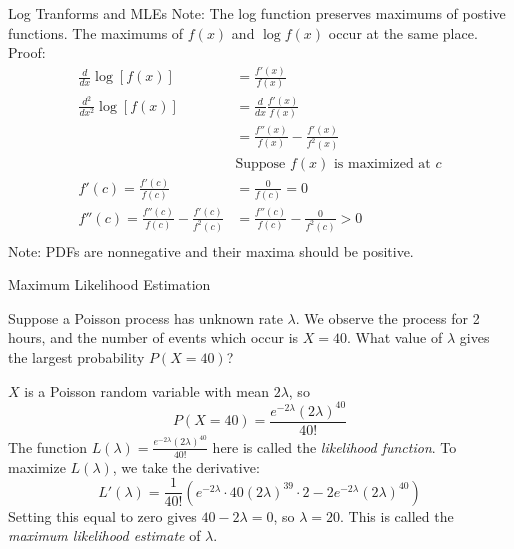 \documentclass[t,handout]{beamer}
\begin{document}
\begin{frame}{Log Tranforms and MLEs}
    Note: The log function preserves maximums of postive functions. The maximums of $f(x)$ and $\log f(x)$ occur at the same place.\\
    Proof:
    { \small
    \begin{align*}
        \frac{d}{dx} \log[f(x)] & = \frac{f'(x)}{f(x)} \\
        \frac{d^2}{dx^2} \log[f(x)] & = \frac{d}{dx} \frac{f'(x)}{f(x)} \\
        & = \frac{f''(x)}{f(x)} - \frac{f'(x)}{f^2(x)} \\
        & \text{Suppose } f(x) \text{ is maximized at } c\\
        f'(c)= \frac{f'(c)}{f(c)} & = \frac{0}{f(c)} = 0\\
        f''(c)= \frac{f''(c)}{f(c)} - \frac{f'(c)}{f^2(c)} & = \frac{f''(c)}{f(c)} - \frac{0}{f^2(c)} > 0\\
    \end{align*}
    }
    Note: PDFs are nonnegative and their maxima should be positive.
\end{frame}
\begin{frame}{Maximum Likelihood Estimation}
    \begin{block}{}
    Suppose a Poisson process has unknown rate $\lambda$. We observe the process for 2 hours, and the number of events which occur is $X=40$. What value of $\lambda$ gives the largest probability $P(X=40)$?
    \end{block}
    \pause $X$ is a Poisson random variable with mean $2\lambda$, so
    $$P(X=40) = \frac{e^{-2\lambda}(2\lambda)^{40}}{40!}$$
    \pause The function $L(\lambda)=\frac{e^{-2\lambda}(2\lambda)^{40}}{40!}$ here is called the \emph{likelihood function}. \pause To maximize $L(\lambda)$, we take the derivative:
    $$L'(\lambda) = 
    \frac1{40!}(e^{-2\lambda}\cdot40(2\lambda)^{39}\cdot2-2e^{-2\lambda}(2\lambda)^{40})$$
    \pause Setting this equal to zero gives $40-2\lambda=0$, so $\lambda=20$. This is called the \emph{maximum likelihood estimate} of $\lambda$.
    \end{frame}
    
\end{document}
